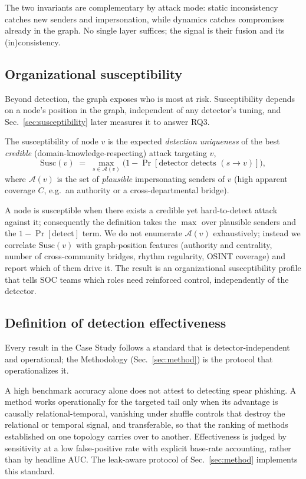 \smallskip
The two invariants are complementary by attack mode: static inconsistency catches new senders and impersonation,
while dynamics catches compromises already in the graph. No single layer suffices; the signal is their fusion and
its (in)consistency.

\subsection{Organizational susceptibility}
\label{sec:m-susc}
Beyond detection, the graph exposes who is most at risk. Susceptibility depends on a node's position in the
graph, independent of any detector's tuning, and Sec.~\ref{sec:susceptibility} later measures it to answer
RQ3.

\begin{definition}[Susceptibility]
\label{def:susc}
The susceptibility of node $v$ is the expected \emph{detection uniqueness} of the best \emph{credible}
(domain-knowledge-respecting) attack targeting $v$,
\begin{equation}
\mathrm{Susc}(v) \;=\; \max_{s\in \mathcal{A}(v)} \Big(1 - \Pr[\text{detector detects } (s\!\to\!v)]\Big),
\label{eq:susc-model}
\end{equation}
where $\mathcal{A}(v)$ is the set of \emph{plausible} impersonating senders of $v$ (high apparent coverage $C$,
e.g.\ an authority or a cross-departmental bridge).
\end{definition}

\noindent A node is susceptible when there exists a credible yet hard-to-detect attack against it; consequently
the definition takes the $\max$ over plausible senders and the $1-\Pr[\text{detect}]$ term. We do not enumerate
$\mathcal{A}(v)$ exhaustively; instead we correlate $\mathrm{Susc}(v)$ with graph-position features (authority
and centrality, number of cross-community bridges, rhythm regularity, OSINT coverage) and report which of them
drive it. The result is an organizational susceptibility profile that tells SOC teams which roles need
reinforced control, independently of the detector.

\subsection{Definition of detection effectiveness}
\label{sec:effectiveness}
Every result in the Case Study follows a standard that is detector-independent and operational; the
Methodology (Sec.~\ref{sec:method}) is the protocol that operationalizes it.

A high benchmark accuracy alone does not attest to detecting spear phishing. A method works operationally for the targeted tail only when its advantage is causally relational-temporal,
vanishing under shuffle controls that destroy the relational or temporal signal, and transferable, so that the
ranking of methods established on one topology carries over to another. Effectiveness is judged by sensitivity
at a low false-positive rate with explicit base-rate accounting, rather than by headline AUC. The leak-aware protocol of Sec.~\ref{sec:method}
implements this standard.
